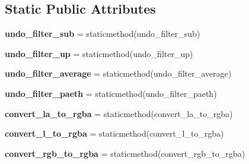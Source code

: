 \subsection*{Static Public Attributes}
\begin{DoxyCompactItemize}
\item 
\mbox{\label{class_python_01_g_u_i_1_1lib_1_1png_1_1pngfilters_a4830e27f18790706a8e7ff95a79aa4c0}} 
{\bfseries undo\+\_\+filter\+\_\+sub} = staticmethod(undo\+\_\+filter\+\_\+sub)
\item 
\mbox{\label{class_python_01_g_u_i_1_1lib_1_1png_1_1pngfilters_a752056847b056e7e5e4c41f9c1407f20}} 
{\bfseries undo\+\_\+filter\+\_\+up} = staticmethod(undo\+\_\+filter\+\_\+up)
\item 
\mbox{\label{class_python_01_g_u_i_1_1lib_1_1png_1_1pngfilters_afebf61d796c7511495da7f94025a5a77}} 
{\bfseries undo\+\_\+filter\+\_\+average} = staticmethod(undo\+\_\+filter\+\_\+average)
\item 
\mbox{\label{class_python_01_g_u_i_1_1lib_1_1png_1_1pngfilters_a57868ec597f886e26f4edae88c43b48f}} 
{\bfseries undo\+\_\+filter\+\_\+paeth} = staticmethod(undo\+\_\+filter\+\_\+paeth)
\item 
\mbox{\label{class_python_01_g_u_i_1_1lib_1_1png_1_1pngfilters_a2722d5093c2929f6e36d14d0b143d196}} 
{\bfseries convert\+\_\+la\+\_\+to\+\_\+rgba} = staticmethod(convert\+\_\+la\+\_\+to\+\_\+rgba)
\item 
\mbox{\label{class_python_01_g_u_i_1_1lib_1_1png_1_1pngfilters_af5e014a2a9325077007f93bb8a02844a}} 
{\bfseries convert\+\_\+l\+\_\+to\+\_\+rgba} = staticmethod(convert\+\_\+l\+\_\+to\+\_\+rgba)
\item 
\mbox{\label{class_python_01_g_u_i_1_1lib_1_1png_1_1pngfilters_a7b24927df55576c910c4f88bc8d2eac8}} 
{\bfseries convert\+\_\+rgb\+\_\+to\+\_\+rgba} = staticmethod(convert\+\_\+rgb\+\_\+to\+\_\+rgba)
\end{DoxyCompactItemize}


